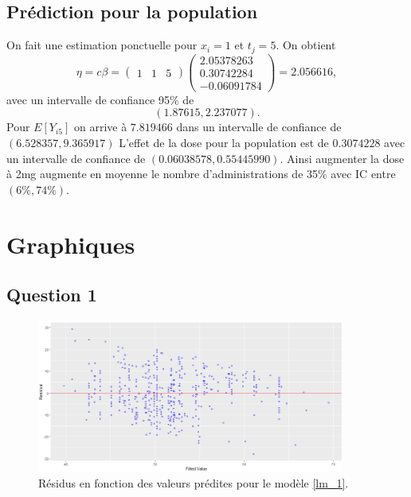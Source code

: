\documentclass{article}
\begin{document}
	\subsection{Prédiction pour la population}
	On fait une estimation ponctuelle pour $ x_i = 1$ et $t_j =5$. On obtient 
	$$\eta = c \beta = 
	\begin{pmatrix}
	1 & 1& 5
	\end{pmatrix}
	\begin{pmatrix}
	2.05378263  \\
	0.30742284 \\
	-0.06091784
	\end{pmatrix} = 2.056616,$$
	avec un intervalle de confiance 95\% de
	$$ (1.87615, 2.237077).$$
	Pour $E[Y_{i5}]$ on arrive à $7.819466$ dans un intervalle de confiance de $(6.528357, 9.365917)$
	L'effet de la dose pour la population est de $0.3074228$ avec un intervalle de confiance de $(0.06038578, 0.55445990)$. Ainsi augmenter la dose à 2mg augmente en moyenne le nombre d'administrations de 35\% avec
	IC entre $ (6\%, 74\%).$
	
\newpage
\appendix
\section{Graphiques}
\renewcommand\thesubsection{\thesection.\arabic{subsection}}
\subsection{Question 1}

\begin{figure}[H]  %
	\centering
	\includegraphics[width=0.9\textwidth]{graphiques/residus_VS_predicitions_lm1}
	\caption{Résidus en fonction des valeurs prédites pour le modèle \eqref{lm_1}.}
	\label{residus_VS_predicitions_lm1}
\end{figure}
\end{document}
